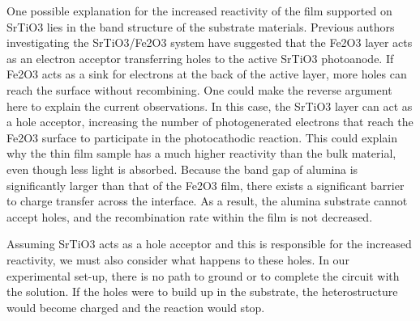 \documentclass[12pt,%
              twoside,
               letterpaper]{uiothesis}
\begin{document}
One possible explanation for the increased reactivity of the film supported on SrTiO3
lies in the band structure of the substrate materials. Previous authors investigating the
SrTiO3/Fe2O3 system have suggested that the Fe2O3 layer acts as an electron
acceptor transferring holes to the active SrTiO3 photoanode.\cite{Wang:2007fp} If
Fe2O3 acts as a sink for electrons at the back of the active layer, more holes can
reach the surface without recombining.  One could make the reverse argument here to
explain the current observations.  In this case, the SrTiO3 layer can act as a hole
acceptor, increasing the number of photogenerated electrons that reach the Fe2O3
surface to participate in the photocathodic reaction.  This could explain why the thin
film sample has a much higher reactivity than the bulk material, even though less light is
absorbed.  Because the band gap of alumina is significantly larger than that of the
Fe2O3 film, there exists a significant barrier to charge transfer across the
interface.  As a result, the alumina substrate cannot accept holes, and the recombination
rate within the film is not decreased.

Assuming SrTiO3 acts as a hole acceptor and this is responsible for the increased
reactivity, we must also consider what happens to these holes.  In our experimental
set-up, there is no path to ground or to complete the circuit with the solution.  If the
holes were to build up in the substrate, the heterostructure would become charged and the
reaction would stop.
\end{document}
